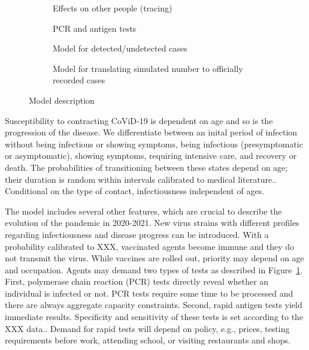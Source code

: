 \begin{figure}[!tp]
\begin{subfigure}[b]{0.475\textwidth}
        Effects on other people (tracing)

        \caption{{\small PCR and antigen tests}}
        \label{fig:pcr_antigen_tests}
    \end{subfigure}
    \begin{subfigure}[b]{0.475\textwidth}
        \centering

        Model for detected/undetected cases

        \caption{{\small Model for translating simulated number to officially recorded cases}}
        \label{fig:model_for_official_cases}
    \end{subfigure}

    \caption{Model description}
\end{figure}


Susceptibility to contracting CoViD-19 is dependent on age and so is the progression of the disease. We differentiate between an inital period of infection without being infectious or showing symptoms, being infectious (presymptomatic or asymptomatic), showing symptoms, requiring intensive care, and recovery or death. The probabilities of transitioning between these states depend on age; their duration is random within intervals calibrated to medical literature.. Conditional on the type of contact, infectiousness independent of ages.

The model includes several other features, which are crucial to describe the evolution of the pandemic in 2020-2021. New virus strains with different profiles regarding infectiousness and disease progress can be introduced. With a probability calibrated to XXX, vaccinated agents become immune and they do not transmit the virus. While vaccines are rolled out, priority may depend on age and occupation. Agents may demand two types of tests as described in Figure~\ref{fig:pcr_antigen_tests}. First, polymerase chain reaction (PCR) tests directly reveal whether an individual is infected or not. PCR tests require some time to be processed and there are always aggregate capacity constraints. Second, rapid antigen tests yield immediate results. Specificity and sensitivity of these tests is set according to the XXX data.. Demand for rapid tests will depend on policy, e.g., prices, testing requirements before work, attending school, or visiting restaurants and shops.



